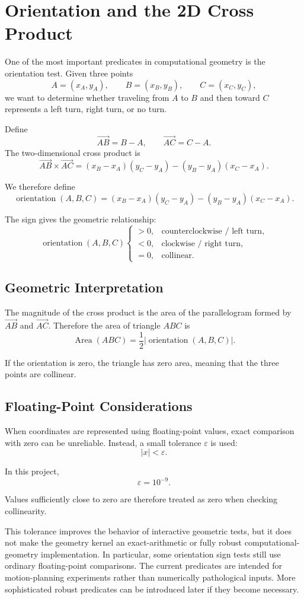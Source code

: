 \section{Orientation and the 2D Cross Product}

One of the most important predicates in computational geometry is the
orientation test. Given three points
\[
A=(x_A,y_A),\qquad B=(x_B,y_B),\qquad C=(x_C,y_C),
\]
we want to determine whether traveling from $A$ to $B$ and then toward $C$
represents a left turn, right turn, or no turn.

Define
\[
\overrightarrow{AB}=B-A, \qquad \overrightarrow{AC}=C-A.
\]
The two-dimensional cross product is
\[
\overrightarrow{AB}\times\overrightarrow{AC}
=(x_B-x_A)(y_C-y_A)-(y_B-y_A)(x_C-x_A).
\]

We therefore define
\[
\operatorname{orientation}(A,B,C)
=(x_B-x_A)(y_C-y_A)-(y_B-y_A)(x_C-x_A).
\]

The sign gives the geometric relationship:
\[
\operatorname{orientation}(A,B,C)
\begin{cases}
>0, & \text{counterclockwise / left turn},\\
<0, & \text{clockwise / right turn},\\
=0, & \text{collinear}.
\end{cases}
\]

\subsection{Geometric Interpretation}

The magnitude of the cross product is the area of the parallelogram formed
by $\overrightarrow{AB}$ and $\overrightarrow{AC}$. Therefore the area of
triangle $ABC$ is
\[
\operatorname{Area}(ABC)
=\frac{1}{2}\left|\operatorname{orientation}(A,B,C)\right|.
\]

If the orientation is zero, the triangle has zero area, meaning that the
three points are collinear.

\subsection{Floating-Point Considerations}

When coordinates are represented using floating-point values, exact
comparison with zero can be unreliable. Instead, a small tolerance
$\varepsilon$ is used:
\[
|x|<\varepsilon.
\]

In this project,
\[
\varepsilon=10^{-9}.
\]

Values sufficiently close to zero are therefore treated as zero when
checking collinearity.

This tolerance improves the behavior of interactive geometric tests, but it
does not make the geometry kernel an exact-arithmetic or fully robust
computational-geometry implementation. In particular, some orientation sign
tests still use ordinary floating-point comparisons. The current predicates
are intended for motion-planning experiments rather than numerically
pathological inputs. More sophisticated robust predicates can be introduced
later if they become necessary.
